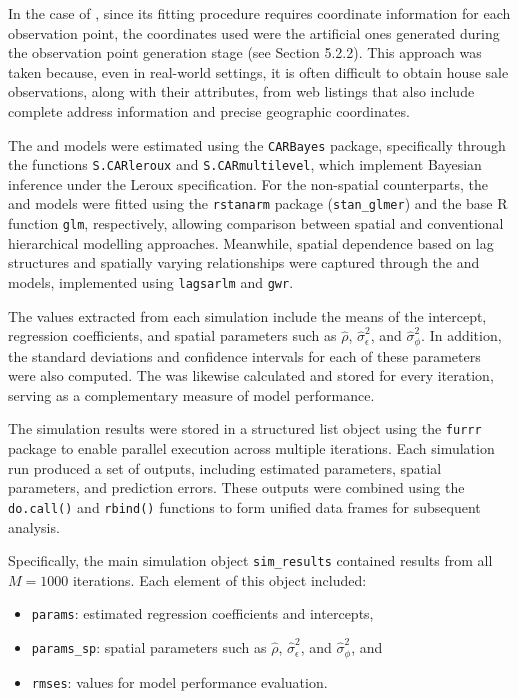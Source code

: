 \documentclass[
  letterpaper,
  DIV=11,
  numbers=noendperiod]{scrartcl}
\begin{document}
In the case of , since its fitting procedure requires
coordinate information for each observation point, the coordinates used
were the artificial ones generated during the observation point
generation stage (see Section 5.2.2). This approach was taken because,
even in real-world settings, it is often difficult to obtain house sale
observations, along with their attributes, from web listings that also
include complete address information and precise geographic coordinates.

The  and  models were estimated using the
\texttt{CARBayes} package, specifically through the functions
\texttt{S.CARleroux} and \texttt{S.CARmultilevel}, which implement
Bayesian inference under the Leroux specification. For the non-spatial
counterparts, the  and  models were fitted using the
\texttt{rstanarm} package (\texttt{stan\_glmer}) and the base R function
\texttt{glm}, respectively, allowing comparison between spatial and
conventional hierarchical modelling approaches. Meanwhile, spatial
dependence based on lag structures and spatially varying relationships
were captured through the  and  models, implemented
using \texttt{lagsarlm} and \texttt{gwr}.

The values extracted from each simulation include the means of the
intercept, regression coefficients, and spatial parameters such as
\(\hat{\rho}\), \(\hat{\sigma}^2_{\epsilon}\), and
\(\hat{\sigma}^2_{\phi}\). In addition, the standard deviations and
confidence intervals for each of these parameters were also computed.
The  was likewise calculated and stored for every iteration,
serving as a complementary measure of model performance.

The simulation results were stored in a structured list object using the
\texttt{furrr} package to enable parallel execution across multiple
iterations. Each simulation run produced a set of outputs, including
estimated parameters, spatial parameters, and prediction errors. These
outputs were combined using the \texttt{do.call()} and \texttt{rbind()}
functions to form unified data frames for subsequent analysis.

Specifically, the main simulation object \texttt{sim\_results} contained
results from all \(M = 1000\) iterations. Each element of this object
included:

\begin{itemize}
\item
  \texttt{params}: estimated regression coefficients and intercepts,
\item
  \texttt{params\_sp}: spatial parameters such as \(\hat{\rho}\),
  \(\hat{\sigma}^2_{\epsilon}\), and \(\hat{\sigma}^2_{\phi}\), and
\item
  \texttt{rmses}:  values for model performance evaluation.
\end{itemize}
\end{document}
